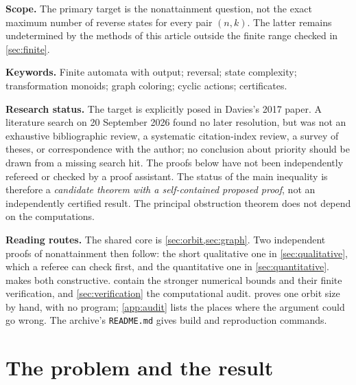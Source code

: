 \documentclass[11pt,a4paper]{article}
\numberwithin{equation}{section}
\theoremstyle{definition}
\theoremstyle{remark}
\begin{document}
\begin{titlepage}
\noindent\textbf{Scope.} The primary target is the nonattainment question,
not the exact maximum number of reverse states for every pair $(n,k)$.
The latter remains undetermined by the methods of this article outside the
finite range checked in \cref{sec:finite}.

\vspace{0.4em}
\noindent\textbf{Keywords.} Finite automata with output; reversal; state
complexity; transformation monoids; graph coloring; cyclic actions;
certificates.
\vfill
\begin{resultbox}
\textbf{Research status.} The target is explicitly posed in Davies's 2017
paper. A literature search on 20 September 2026 found no later resolution,
but was not an exhaustive bibliographic review, a systematic citation-index
review, a survey of theses, or correspondence with the author; no conclusion
about priority should be drawn from a missing search hit. The proofs below
have not been independently refereed or checked by a proof assistant.
The status of the main inequality is therefore a \emph{candidate theorem with
a self-contained proposed proof}, not an independently certified result.
The principal obstruction theorem does not depend on the computations.
\end{resultbox}
\end{titlepage}

\tableofcontents
\vspace{7mm}
\begin{resultbox}
\textbf{Reading routes.} The shared core is
\cref{sec:orbit,sec:graph}. Two independent proofs of nonattainment then
follow: the short qualitative one in \cref{sec:qualitative}, which a referee
can check first, and the quantitative one in \cref{sec:quantitative}.
 makes both constructive.
 contain the stronger numerical bounds and
their finite verification, and \cref{sec:verification} the computational
audit.  proves one orbit size by hand, with no program;
\cref{app:audit} lists the places where the argument could go wrong.
The archive's \texttt{README.md} gives build and reproduction commands.
\end{resultbox}
\newpage

\section{The problem and the result}\label{sec:introduction}
\end{document}
